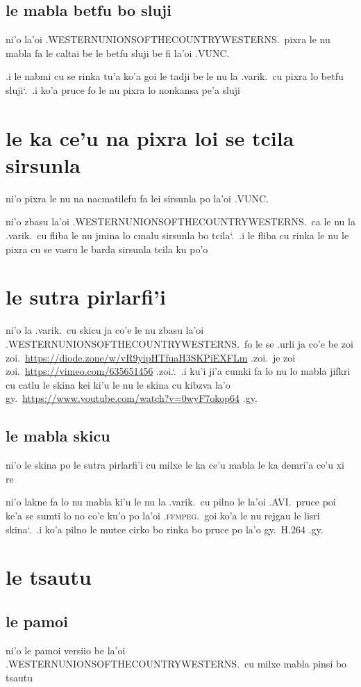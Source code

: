 \documentclass{report}
\newcommand\sds{\spacefactor\sfcode`.\ \space}
\begin{document}
\subsection{le mabla betfu bo sluji}
ni'o la'oi .WESTERNUNIONSOFTHECOUNTRYWESTERNS.\ pixra le nu mabla fa le caltai be le betfu sluji be fi la'oi .VUNC.

.i le nabmi cu se rinka tu'a ko'a goi le tadji be le nu la .varik.\ cu pixra lo betfu sluji\sds  .i ko'a pruce fo le nu pixra lo nonkansa pe'a sluji

\section{le ka ce'u na pixra loi se tcila sirsunla}
ni'o pixra le nu na nacmatilcfu fa lei sirsunla po la'oi .VUNC.

ni'o zbasu la'oi .WESTERNUNIONSOFTHECOUNTRYWESTERNS.\ ca le nu la .varik.\ cu fliba le nu jmina lo cmalu sirsunla bo tcila\sds  .i le fliba cu rinka le nu le pixra cu se vasru le barda sirsunla tcila ku po'o

\section{le sutra pirlarfi'i}
ni'o la .varik.\ cu skicu ja co'e le nu zbasu la'oi .WESTERNUNIONSOFTHECOUNTRYWESTERNS.\ fo le se .urli ja co'e be zoi zoi.\ \url{https://diode.zone/w/vR9yipHTfuaH3SKPiEXFLm} .zoi.\ je zoi zoi.\ \url{https://vimeo.com/635651456} .zoi.\sds  .i ku'i ji'a cumki fa lo nu lo mabla jifkri cu catlu le skina kei ki'u le nu le skina cu kibzva la'o gy.\ \url{https://www.youtube.com/watch?v=0wyF7okop64} .gy.

\subsection{le mabla skicu}
ni'o le skina po le sutra pirlarfi'i cu milxe le ka ce'u mabla le ka demri'a ce'u xi re

ni'o lakne fa lo nu mabla ki'u le nu la .varik.\ cu pilno le la'oi .AVI.\ pruce poi ke'a se sumti lo no co'e ku'o po la'oi .\textsc{ffmpeg}.\ goi ko'a le nu rejgau le lisri skina\sds  .i ko'a pilno le mutce cirko bo rinka bo pruce po la'o gy.\ H.264 .gy.

\section{le tsautu}
\subsection{le pamoi}
ni'o le pamoi versiio be la'oi .WESTERNUNIONSOFTHECOUNTRYWESTERNS.\ cu milxe mabla pinsi bo tsautu
\end{document}
